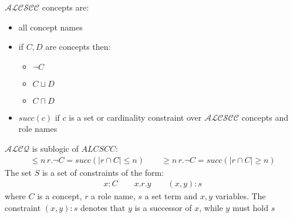 \documentclass[a4paper,11pt]{scrartcl}
\theoremstyle{definition}
\begin{document}
$\mathcal{ALCSCC}$ concepts are:
\begin{itemize}
\item all concept names
\item if $C,D$ are concepts then:
\begin{itemize}
\item $\neg C$
\item $C\sqcup D$
\item $C\sqcap D$
\end{itemize}
\item $succ(c)$ if $c$ is a set or cardinality constraint over $\mathcal{ALCSCC}$ concepts and role names
\end{itemize}
$\mathcal{ALCQ}$ is sublogic of $ALCSCC$:
\begin{align*}
\leq n\,r.\neg C = succ(|r\cap C|\leq n)\quad\quad \geq n\,r.\neg C = succ(|r\cap C|\geq n)
\end{align*}
The set $S$ is a set of constraints of the form:
\begin{align*}
x:C\quad\quad x.r.y\quad\quad (x,y):s
\end{align*}
where $C$ is a concept, $r$ a role name, $s$ a set term and $x,y$ variables. The constraint $(x,y):s$ denotes that $y$ is a successor of $x$, while $y$ must hold $s$\\
\end{document}
